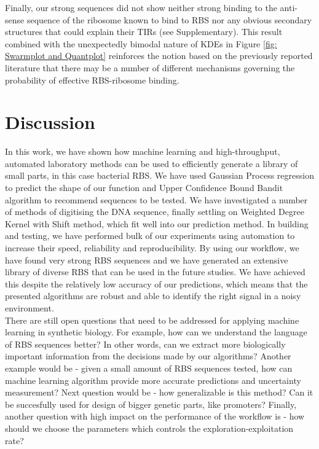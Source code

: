\documentclass{article}
\begin{document}
Finally, our strong sequences did not show neither strong binding to the anti-sense sequence of the ribosome known to bind to RBS nor any obvious secondary structures that could explain their TIRs (see Supplementary).
This result combined with the unexpectedly bimodal nature of KDEs in Figure \ref{fig: Swarmplot and Quantplot} reinforces the notion based on the previously reported literature \cite{Saito2020,EspahBorujeni2016} that there may be a number of different mechanisms governing the probability of effective RBS-ribosome binding.\\


\section{Discussion}

In this work, we have shown how machine learning and high-throughput, automated laboratory methods can be used to efficiently generate a library of small parts, in this case bacterial RBS. 
We have used Gaussian Process regression to predict the shape of our function and Upper Confidence Bound Bandit algorithm to recommend sequences to be tested.
We have investigated a number of methods of digitising the DNA sequence, finally settling on Weighted Degree Kernel with Shift method, which fit well into our prediction method.
In building and testing, we have performed bulk of our experiments using automation to increase their speed, reliability and reproducibility.
By using our workflow, we have found very strong RBS sequences and we have generated an extensive library of diverse RBS that can be used in the future studies.
We have achieved this despite the relatively low accuracy of our predictions, which means that the presented algorithms are robust and able to identify the right signal in a noisy environment. \\

There are still open questions that need to be addressed for applying machine learning in synthetic biology.
For example, how can we understand the language of RBS sequences better?
In other words, can we extract more biologically important information from the decisions made by our algorithms?
Another example would be - given a small amount of RBS sequences tested, how can machine learning algorithm provide more accurate predictions and uncertainty measurement? 
Next question would be - how generalizable is this method? Can it be succesfully used for design of bigger genetic parts, like promoters?
Finally, another question with high impact on the performance of the workflow is - how should we choose the parameters which controls the exploration-exploitation rate? \\
\end{document}
